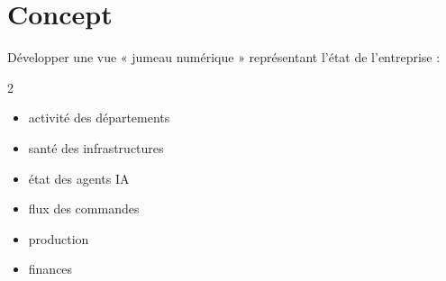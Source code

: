 \documentclass[12pt,a4paper,oneside]{book}
\begin{document}
\section{Concept}
Développer une vue « jumeau numérique » représentant l'état de l'entreprise :
\begin{multicols}{2}
\begin{itemize}
\item activité des départements
\item santé des infrastructures
\item état des agents IA
\item flux des commandes
\item production
\item finances
\end{itemize}
\end{multicols}

\appendix
\end{document}

